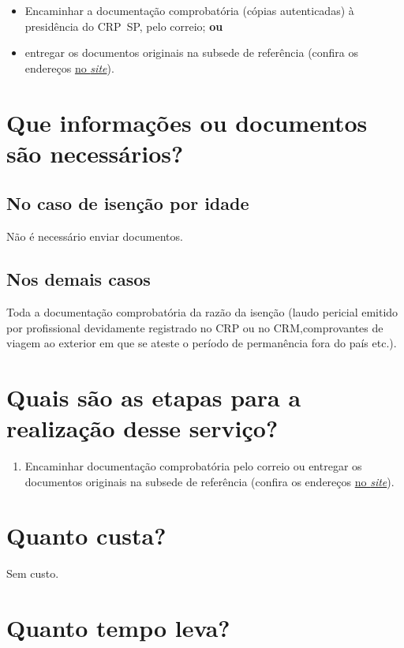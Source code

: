 \begin{itemize}
\item
Encaminhar a documentação comprobatória (cópias autenticadas) à presidência do CRP~SP, pelo correio; \textbf{ou}
\item 
entregar os documentos originais na subsede de referência (confira os endereços \href{https://www.crpsp.org/sede/index}{no \emph{site}}).
\end{itemize}

\section{Que informações ou documentos são necessários?}

\subsection{No caso de isenção por idade}

Não é necessário enviar documentos.

\subsection{Nos demais casos}

Toda a documentação comprobatória da razão da isenção (laudo pericial emitido por profissional devidamente registrado no CRP ou no CRM,comprovantes de viagem ao exterior em que se ateste o período de permanência fora do país etc.).

\section{Quais são as etapas para a realização desse serviço?}

\begin{enumerate}
  \item  Encaminhar documentação comprobatória pelo correio ou entregar os  documentos originais na subsede de referência (confira os endereços  \href{https://www.crpsp.org/sede/index}{no \emph{site}}).
\end{enumerate}

\section{Quanto custa?}

Sem custo.

\section{Quanto tempo leva?}

